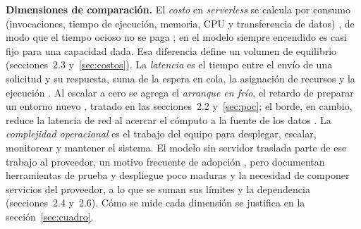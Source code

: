 \documentclass[12pt, letterpaper, table, xcdraw]{inf-pucv}
\begin{document}
\textbf{Dimensiones de comparación.} El \textit{costo} en \textit{serverless} se calcula por consumo (invocaciones, tiempo de ejecución, memoria, CPU y transferencia de datos) \parencite{ghorbian2026}, de modo que el tiempo ocioso no se paga \parencite{gojko_adzic_serverless_2017}; en el modelo siempre encendido es casi fijo para una capacidad dada. Esa diferencia define un volumen de equilibrio (secciones~2.3 y~\ref{sec:costos}). La \textit{latencia} es el tiempo entre el envío de una solicitud y su respuesta, suma de la espera en cola, la asignación de recursos y la ejecución \parencite{golec2025coldstart}. Al escalar a cero se agrega el \textit{arranque en frío}, el retardo de preparar un entorno nuevo \parencite{ustiugov2021}, tratado en las secciones~2.2 y~\ref{sec:poc}; el borde, en cambio, reduce la latencia de red al acercar el cómputo a la fuente de los datos \parencite{golec2025coldstart}. La \textit{complejidad operacional} es el trabajo del equipo para desplegar, escalar, monitorear y mantener el sistema. El modelo sin servidor traslada parte de ese trabajo al proveedor, un motivo frecuente de adopción \parencite{eismann2021}, pero \textcite{leitner2019} documentan herramientas de prueba y despliegue poco maduras y la necesidad de componer servicios del proveedor, a lo que se suman sus límites y la dependencia (secciones~2.4 y~2.6). Cómo se mide cada dimensión se justifica en la sección~\ref{sec:cuadro}.
\end{document}
